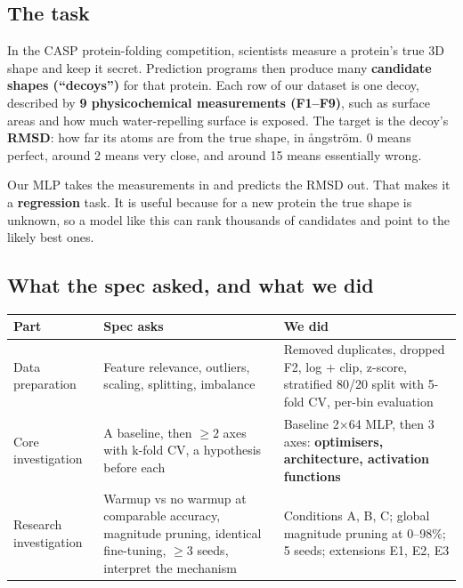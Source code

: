 \documentclass[11pt,a4paper]{article}
\begin{document}
\subsection*{The task}
In the CASP protein-folding competition, scientists measure a protein's true 3D shape and keep it secret.
Prediction programs then produce many \textbf{candidate shapes (``decoys'')} for that protein. Each row of our
dataset is one decoy, described by \textbf{9 physicochemical measurements (F1--F9)}, such as surface areas and
how much water-repelling surface is exposed. The target is the decoy's \textbf{RMSD}: how far its atoms are from the
true shape, in ångström. 0 means perfect, around 2 means very close, and around 15 means essentially wrong.

Our MLP takes the measurements in and predicts the RMSD out. That makes it a \textbf{regression} task. It is useful
because for a new protein the true shape is unknown, so a model like this can rank thousands of candidates and point
to the likely best ones.

\subsection*{What the spec asked, and what we did}
\begin{tabularx}{\linewidth}{@{}p{3.3cm}YY@{}}
\toprule
Part & Spec asks & We did \\
\midrule
Data preparation & Feature relevance, outliers, scaling, splitting, imbalance & Removed duplicates, dropped F2, log + clip, z-score, stratified 80/20 split with 5-fold CV, per-bin evaluation \\
Core investigation & A baseline, then $\geq 2$ axes with k-fold CV, a hypothesis before each & Baseline 2$\times$64 MLP, then 3 axes: \textbf{optimisers, architecture, activation functions} \\
Research investigation & Warmup vs no warmup at comparable accuracy, magnitude pruning, identical fine-tuning, $\geq 3$ seeds, interpret the mechanism & Conditions A, B, C; global magnitude pruning at 0--98\%; 5 seeds; extensions E1, E2, E3 \\
\bottomrule
\end{tabularx}
\end{document}
